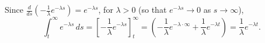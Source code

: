 \begin{example}
Since $\frac{d}{ds}\left(-\frac{1}{\lambda}e^{-\lambda s}\right) = e^{-\lambda s}$, for $\lambda>0$ (so that $e^{-\lambda s}\to 0$ as $s\to\infty$),
\[
\int_t^\infty e^{-\lambda s}\,ds
= \left[-\frac{1}{\lambda}e^{-\lambda s}\right]_t^\infty
= \left(-\frac{1}{\lambda}e^{-\lambda \cdot \infty} + \frac{1}{\lambda}e^{-\lambda t}\right)
= \frac{1}{\lambda}e^{-\lambda t}.
\]
\end{example}
